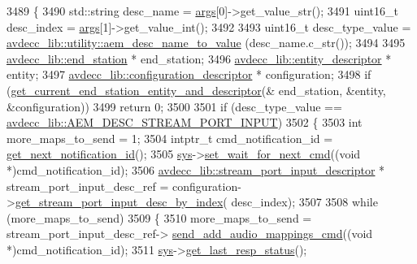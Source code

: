\begin{DoxyCode}
3489 \{
3490     std::string desc\_name = \hyperlink{namespaceastime__fitline_a8187411843a6284ffb964ef3fb9fcab3}{args}[0]->get\_value\_str();
3491     uint16\_t desc\_index = \hyperlink{namespaceastime__fitline_a8187411843a6284ffb964ef3fb9fcab3}{args}[1]->get\_value\_int();
3492 
3493     uint16\_t desc\_type\_value = \hyperlink{namespaceavdecc__lib_1_1utility_a9f6076e32fa227555a95b6e95ea1e29b}{avdecc\_lib::utility::aem\_desc\_name\_to\_value}
      (desc\_name.c\_str());
3494 
3495     \hyperlink{classavdecc__lib_1_1end__station}{avdecc\_lib::end\_station} * end\_station;
3496     \hyperlink{classavdecc__lib_1_1entity__descriptor}{avdecc\_lib::entity\_descriptor} * entity;
3497     \hyperlink{classavdecc__lib_1_1configuration__descriptor}{avdecc\_lib::configuration\_descriptor} * configuration;
3498     \textcolor{keywordflow}{if} (\hyperlink{classcmd__line_ac2d4611fba7db03d436a2e3c1e64828e}{get\_current\_end\_station\_entity\_and\_descriptor}(&
      end\_station, &entity, &configuration))
3499         \textcolor{keywordflow}{return} 0;
3500 
3501     \textcolor{keywordflow}{if} (desc\_type\_value == \hyperlink{namespaceavdecc__lib_ac7b7d227e46bc72b63ee9e9aae15902fa54a680de439da84c5d5037a246d55b3f}{avdecc\_lib::AEM\_DESC\_STREAM\_PORT\_INPUT})
3502     \{
3503         \textcolor{keywordtype}{int} more\_maps\_to\_send = 1;
3504         intptr\_t cmd\_notification\_id = \hyperlink{classcmd__line_a57486218387d1aa9d262eb7c176154ad}{get\_next\_notification\_id}();
3505         \hyperlink{classcmd__line_a485db4800e331cb4052c447fdf5d154e}{sys}->\hyperlink{classavdecc__lib_1_1system_a26b769584f10225077da47583edda33e}{set\_wait\_for\_next\_cmd}((\textcolor{keywordtype}{void} *)cmd\_notification\_id);
3506         \hyperlink{classavdecc__lib_1_1stream__port__input__descriptor}{avdecc\_lib::stream\_port\_input\_descriptor} * 
      stream\_port\_input\_desc\_ref = configuration->\hyperlink{classavdecc__lib_1_1configuration__descriptor_ad05646251e84a4024f317dd82395b8f7}{get\_stream\_port\_input\_desc\_by\_index}(
      desc\_index);
3507 
3508         \textcolor{keywordflow}{while} (more\_maps\_to\_send)
3509         \{
3510             more\_maps\_to\_send = stream\_port\_input\_desc\_ref->
      \hyperlink{classavdecc__lib_1_1stream__port__input__descriptor_a5d94b5190eaba5a650afd90d6e483d72}{send\_add\_audio\_mappings\_cmd}((\textcolor{keywordtype}{void} *)cmd\_notification\_id);
3511             \hyperlink{classcmd__line_a485db4800e331cb4052c447fdf5d154e}{sys}->\hyperlink{classavdecc__lib_1_1system_aa63e8d1a4e51f695cdcccc9340922407}{get\_last\_resp\_status}();

\end{DoxyCode}
